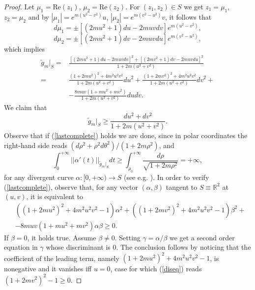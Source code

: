 \documentclass[11pt, reqno]{amsart}
\begin{document}
\begin{proof}
Let $\mu_1=\mathrm{Re}(z_1)$, $\mu_2=\mathrm{Re}(z_2)$. For $(z_1,z_2)\in S$ we get $z_1=\mu_1$, $z_2=\mu_2$ and by $|\mu_1|=e^{m(u^2-v^2)}u$, $|\mu_2|=e^{m(v^2-u^2)}v$, it follows that
$$d\mu_1=\pm\left[(2mu^2+1)du-2muvdv\right]e^{m(u^2-v^2)},$$
$$d\mu_2=\pm\left[(2mu^2+1)dv-2muvdu\right]e^{m(v^2-u^2)},$$
which implies
\begin{equation}
\begin{split}\nonumber
\tilde g_m|_S=&\frac{\left[(2mu^2+1)du-2muvdv\right]^2+\left[(2mv^2+1)dv-2muvdu\right]^2}{1+2m(u^2+v^2)}\\
=&\frac{(1+2mu^2)^2+4m^2u^2v^2}{1+2m(u^2+v^2)}du^2+\frac{(1+2mv^2)^2+4m^2u^2v^2}{1+2m(u^2+v^2)}dv^2+\\
&-\frac{8muv(1+mu^2+mv^2)}{1+2m(u^2+v^2)}dudv.
\end{split}
\end{equation}
We claim that
\begin{equation}\label{lastcomplete}
\tilde g_m|_S\geq \frac{du^2+dv^2}{1+2m(u^2+v^2)}.
\end{equation}
Observe that if (\ref{lastcomplete}) holds we are done, since in polar coordinates the right-hand side reads $(d\rho^2+\rho^2d\theta^2)/(1+2m\rho^2)$, and
$$\int_0^{+\infty}||\alpha'(t)||_{\tilde g_m|_S}dt\geq\int_{\rho_0}^{+\infty}\frac{d\rho}{\sqrt{1+2m\rho^2}}=+\infty,$$
for any divergent curve $\alpha\!:[0,+\infty){\rightarrow} S$ (see e.g. \cite[Ex. 5 p. 153]{docarmo}). In order to verify (\ref{lastcomplete}), observe that, for any vector $(\alpha,\beta)$ tangent to $S\equiv {\mathbb{R}}^2$ at $(u,v)$, it is equivalent to
\begin{equation}
\begin{split}\label{diseq}
&\left((1+2mu^2)^2+4m^2u^2v^2-1\right)\alpha^2+\left((1+2mv^2)^2+4m^2u^2v^2-1\right)\beta^2+\\
&-8muv(1+mu^2+mv^2)\alpha\beta\geq 0.
\end{split}
\end{equation}
If $\beta=0$, it holds true. Assume $\beta\neq 0$. Setting $\gamma=\alpha/\beta$ we get a second order equation in $\gamma$ whose discriminant is $0$. The conclusion follows by noticing that the coefficient of the leading term, namely $(1+2mu^2)^2+4m^2u^2v^2-1$, is nonegative and it vanishes iff $u=0$, case for which (\ref{diseq}) reads $(1+2mv^2)^2-1\geq 0$.
\end{proof}
\end{document}
